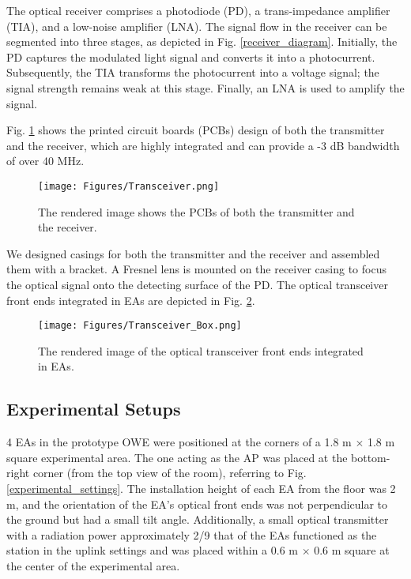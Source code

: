 The optical receiver comprises a photodiode (PD), a trans-impedance amplifier (TIA), and a low-noise amplifier (LNA). The signal flow in the receiver can be segmented into three stages, as depicted in Fig. \ref{receiver_diagram}. Initially, the PD captures the modulated light signal and converts it into a photocurrent. Subsequently, the TIA transforms the photocurrent into a voltage signal; the signal strength remains weak at this stage. Finally, an LNA is used to amplify the signal.
\par
Fig. \ref{PCB_Render} shows the printed circuit boards (PCBs) design of both the transmitter and the receiver, which are highly integrated and can provide a -3 dB bandwidth of over 40 MHz.
\begin{figure}
\centering
\texttt{[image: Figures/Transceiver.png]}
\caption{The rendered image shows the PCBs of both the transmitter and the receiver.}
\label{PCB_Render}
\vspace{-0.2cm}
\end{figure}
We designed casings for both the transmitter and the receiver and assembled them with a bracket. A Fresnel lens is mounted on the receiver casing to focus the optical signal onto the detecting surface of the PD. The optical transceiver front ends integrated in EAs are depicted in Fig. \ref{Transceiver_Rendered}.

\begin{figure}
\centering
\texttt{[image: Figures/Transceiver\_Box.png]}
\caption{The rendered image of the optical transceiver front ends integrated in EAs.}
\label{Transceiver_Rendered}
\vspace{-0.5cm}
\end{figure}

\subsection{Experimental Setups}
4 EAs in the prototype OWE were positioned at the corners of a 1.8 m $\times$ 1.8 m square experimental area. The one acting as the AP was placed at the bottom-right corner (from the top view of the room), referring to Fig. \ref{experimental_settings}. The installation height of each EA from the floor was 2 m, and the orientation of the EA's optical front ends was not perpendicular to the ground but had a small tilt angle. Additionally, a small optical transmitter with a radiation power approximately 2/9 that of the EAs functioned as the station in the uplink settings and was placed within a 0.6 m $\times$ 0.6 m square at the center of the experimental area.

